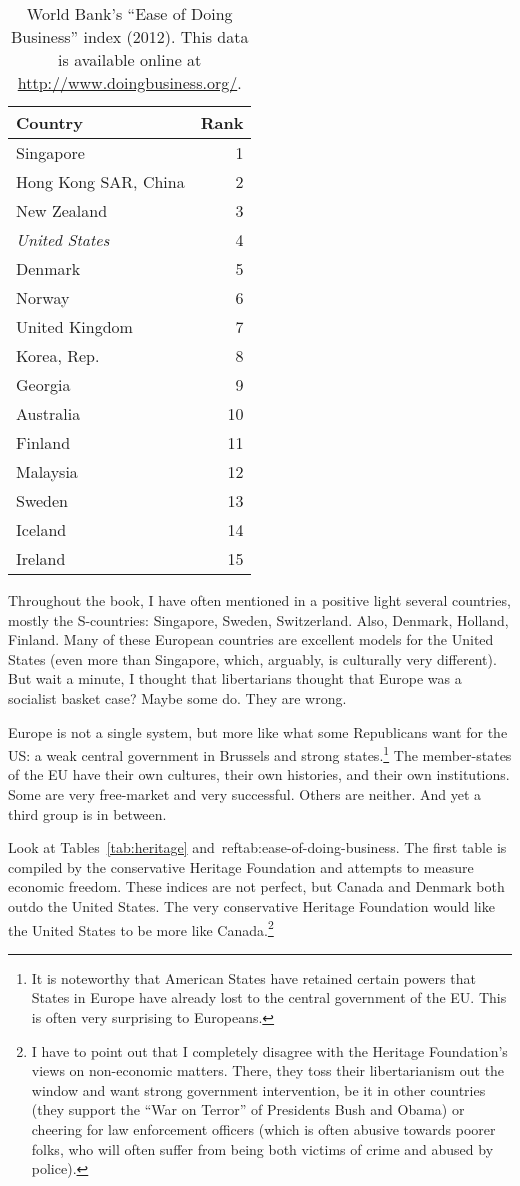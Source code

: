 \begin{table}
\centering
\begin{tabular}{lr}
\toprule
Country & Rank \\
\midrule
Singapore & 1 \\
Hong Kong SAR, China & 2 \\
New Zealand & 3 \\
\emph{United States} & 4 \\
Denmark & 5 \\
Norway & 6 \\
United Kingdom & 7 \\
Korea, Rep. & 8 \\
Georgia & 9 \\
Australia & 10 \\
Finland & 11 \\
Malaysia & 12 \\
Sweden & 13 \\
Iceland & 14 \\
Ireland & 15 \\
\bottomrule
\end{tabular}
\caption{World Bank's ``Ease of Doing Business'' index (2012). This data is
available online at \url{http://www.doingbusiness.org/}.}
\label{tab:ease-of-doing-business}
\end{table}

Throughout the book, I have often mentioned in a positive light several
countries, mostly the S-countries: Singapore, Sweden, Switzerland. Also,
Denmark, Holland, Finland. Many of these European countries are excellent
models for the United States (even more than Singapore, which, arguably, is
culturally very different). But wait a minute, I thought that libertarians
thought that Europe was a socialist basket case? Maybe some do. They are wrong.

Europe is not a single system, but more like what some Republicans want for the
US: a weak central government in Brussels and strong states.\footnote{It is
noteworthy that American States have retained certain powers that States in
Europe have already lost to the central government of the EU. This is often
very surprising to Europeans.} The member-states of the EU have their own
cultures, their own histories, and their own institutions. Some are very
free-market and very successful. Others are neither. And yet a third group is
in between.

Look at Tables~\ref{tab:heritage} and~ref{tab:ease-of-doing-business}. The
first table is compiled by the conservative Heritage Foundation and attempts to
measure economic freedom. These indices are not perfect, but Canada and Denmark
both outdo the United States. The very conservative Heritage Foundation would
like the United States to be more like Canada.\footnote{I have to point out
that I completely disagree with the Heritage Foundation's views on non-economic
matters. There, they toss their libertarianism out the window and want strong
government intervention, be it in other countries (they support the ``War on
Terror'' of Presidents Bush and Obama) or cheering for law enforcement officers
(which is often abusive towards poorer folks, who will often suffer from being
both victims of crime and abused by police).}

